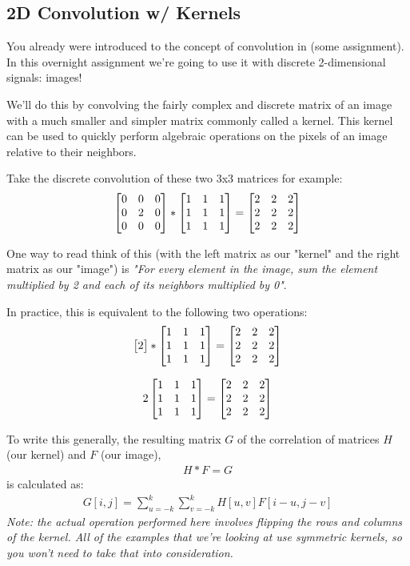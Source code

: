 \documentclass{tufte-handout}
\begin{document}
\subsection{2D Convolution w/ Kernels}  %

You already were introduced to the concept of convolution in (some assignment). In this overnight assignment we're going to use it with discrete 2-dimensional signals: images!

We'll do this by convolving the fairly complex and discrete matrix of an image with a much smaller and simpler matrix commonly called a kernel. This kernel can be used to quickly perform algebraic operations on the pixels of an image relative to their neighbors.

Take the discrete convolution of these two 3x3 matrices for example:
\begin{align}
    \begin{bmatrix} 0 & 0 & 0 \\ 0 & 2 & 0 \\ 0 & 0 & 0 \end{bmatrix} * \begin{bmatrix} 1 & 1 & 1 \\ 1 & 1 & 1 \\ 1 & 1 & 1 \end{bmatrix} =
    \begin{bmatrix} 2 & 2 & 2 \\ 2 & 2 & 2 \\ 2 & 2 & 2 \end{bmatrix}
\end{align}

One way to read think of this (with the left matrix as our "kernel" and the right matrix as our "image") is \emph{"For every element in the image, sum the element multiplied by 2 and each of its neighbors multiplied by 0"}.

In practice, this is equivalent to the following two operations:
\begin{align}\label{eqn:convolution1}
    \begin{bmatrix}2\end{bmatrix} * \begin{bmatrix} 1 & 1 & 1 \\ 1 & 1 & 1 \\ 1 & 1 & 1 \end{bmatrix} =
    \begin{bmatrix} 2 & 2 & 2 \\ 2 & 2 & 2 \\ 2 & 2 & 2 \end{bmatrix}
\end{align}

\begin{align}
    2 \begin{bmatrix} 1 & 1 & 1 \\ 1 & 1 & 1 \\ 1 & 1 & 1 \end{bmatrix} = \begin{bmatrix} 2 & 2 & 2 \\ 2 & 2 & 2 \\ 2 & 2 & 2 \end{bmatrix}
\end{align}

To write this generally, the resulting matrix $G$ of the correlation of matrices $H$ (our kernel) and $F$ (our image),
\begin{align}
    H * F = G
\end{align}
is calculated as:
\begin{align}
    G[i, j] = \sum_{u=-k}^{k} \sum_{v=-k}^{k} H[u, v] F[i - u, j - v]
\end{align}
\emph{Note: the actual operation performed here involves flipping the rows and columns of the kernel. All of the examples that we're looking at use symmetric kernels, so you won't need to take that into consideration.}
\end{document}
